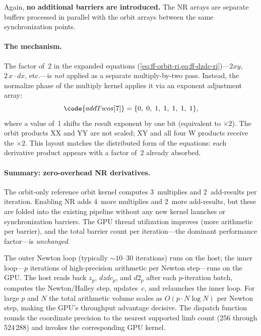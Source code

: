 Again, \textbf{no additional barriers are introduced.}  The NR arrays
are separate buffers processed in parallel with the orbit arrays
between the same synchronization points.

\paragraph{The  mechanism.}
The factor of~2 in the expanded equations
(\cref{eq:ff-orbit-ri,eq:ff-dzdc-ri})---$2xy$,
$2\,x \cdot dx$, etc.---is \emph{not} applied as a separate
multiply-by-two pass.  Instead, the normalize phase of the multiply
kernel applies it via an  exponent adjustment array:
\[
\code{addTwos[7]} = \{0,\; 0,\; 1,\; 1,\; 1,\; 1,\; 1\},
\]
where a value of~1 shifts the result exponent by one bit (equivalent to
$\times 2$).  The orbit products XX and YY are not scaled; XY and all
four W products receive the $\times 2$.  This layout matches the distributed
form of the equations: each derivative product appears with a factor
of~2 already absorbed.

\paragraph{Summary: zero-overhead NR derivatives.}
The orbit-only reference orbit kernel computes 3~multiplies and
2~add-results per iteration.  Enabling NR adds 4~more multiplies and
2~more add-results, but these are folded into the existing pipeline
without any new kernel launches or synchronization barriers.  The GPU
thread utilization improves (more arithmetic per barrier), and the
total barrier count per iteration---the dominant performance
factor---is \emph{unchanged}.

\medskip
\noindent
The outer Newton loop (typically ${\sim}10$--$30$ iterations) runs on
the host; the inner loop---$p$ iterations of high-precision
arithmetic per Newton step---runs on the GPU.  The host reads back
$z_p$, $\mathit{dzdc}_p$, and $d2_p$ after each $p$-iteration batch,
computes the Newton/Halley step, updates~$c$, and relaunches the inner
loop.  For large $p$ and $N$ the total arithmetic volume scales as
$O(p \cdot N \log N)$ per Newton step, making the GPU's throughput
advantage decisive.  The dispatch function
 rounds the coordinate precision to
the nearest supported  limb count (256 through
524\,288) and invokes the corresponding GPU kernel.

